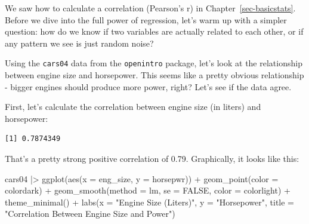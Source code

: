\documentclass[
  letterpaper,
]{book}
\newenvironment{Shaded}{\begin{snugshade}}{\end{snugshade}}
\newcommand{\AttributeTok}[1]{\textcolor[rgb]{0.40,0.45,0.13}{#1}}
\newcommand{\ConstantTok}[1]{\textcolor[rgb]{0.56,0.35,0.01}{#1}}
\newcommand{\FunctionTok}[1]{\textcolor[rgb]{0.28,0.35,0.67}{#1}}
\newcommand{\NormalTok}[1]{\textcolor[rgb]{0.00,0.23,0.31}{#1}}
\newcommand{\SpecialCharTok}[1]{\textcolor[rgb]{0.37,0.37,0.37}{#1}}
\newcommand{\StringTok}[1]{\textcolor[rgb]{0.13,0.47,0.30}{#1}}
\begin{document}
We saw how to calculate a correlation (Pearson's r) in
Chapter~\ref{sec-basicstats}. Before we dive into the full power of
regression, let's warm up with a simpler question: how do we know if two
variables are actually related to each other, or if any pattern we see
is just random noise?

Using the \texttt{cars04} data from the \texttt{openintro} package,
let's look at the relationship between engine size and horsepower. This
seems like a pretty obvious relationship - bigger engines should produce
more power, right? Let's see if the data agree.

First, let's calculate the correlation between engine size (in liters)
and horsepower:

\begin{Shaded}
\end{Shaded}

\begin{verbatim}
[1] 0.7874349
\end{verbatim}

That's a pretty strong positive correlation of 0.79. Graphically, it
looks like this:

\begin{Shaded}
\begin{Highlighting}[]
\NormalTok{cars04 }\SpecialCharTok{|\textgreater{}} \FunctionTok{ggplot}\NormalTok{(}\FunctionTok{aes}\NormalTok{(}\AttributeTok{x =}\NormalTok{ eng\_size, }\AttributeTok{y =}\NormalTok{ horsepwr)) }\SpecialCharTok{+}
    \FunctionTok{geom\_point}\NormalTok{(}\AttributeTok{color =}\NormalTok{ colordark) }\SpecialCharTok{+}
    \FunctionTok{geom\_smooth}\NormalTok{(}\AttributeTok{method =}\NormalTok{ lm, }
                \AttributeTok{se =} \ConstantTok{FALSE}\NormalTok{,}
                \AttributeTok{color =}\NormalTok{ colorlight) }\SpecialCharTok{+}
    \FunctionTok{theme\_minimal}\NormalTok{() }\SpecialCharTok{+}
    \FunctionTok{labs}\NormalTok{(}\AttributeTok{x =} \StringTok{"Engine Size (Liters)"}\NormalTok{,}
         \AttributeTok{y =} \StringTok{"Horsepower"}\NormalTok{,}
         \AttributeTok{title =} \StringTok{"Correlation Between Engine Size and Power"}\NormalTok{)}
\end{Highlighting}
\end{Shaded}
\end{document}
